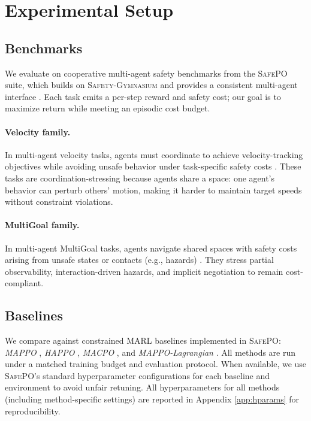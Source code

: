 \documentclass{article}
\theoremstyle{plain}
\theoremstyle{definition}
\theoremstyle{remark}
\begin{document}

\section{Experimental Setup}
\label{sec:experiments}

\subsection{Benchmarks}
We evaluate on cooperative multi-agent safety benchmarks from the \textsc{SafePO} suite, which builds on \textsc{Safety-Gymnasium} and provides a consistent multi-agent interface \citep{ji2024safetygymnasiumunifiedsafereinforcement}.
Each task emits a per-step reward and safety cost; our goal is to maximize return while meeting an episodic cost budget.

\paragraph{Velocity family.}
In multi-agent velocity tasks, agents must coordinate to achieve velocity-tracking objectives while avoiding unsafe behavior under task-specific safety costs \citep{6386109}.
These tasks are coordination-stressing because agents share a space: one agent’s behavior can perturb others’ motion, making it harder to maintain target speeds without constraint violations.

\paragraph{MultiGoal family.}
In multi-agent MultiGoal tasks, agents navigate shared spaces with safety costs arising from unsafe states or contacts (e.g., hazards) \citep{ji2024safetygymnasiumunifiedsafereinforcement}.
They stress partial observability, interaction-driven hazards, and implicit negotiation to remain cost-compliant.

\subsection{Baselines}
We compare against constrained MARL baselines implemented in \textsc{SafePO}: \emph{MAPPO} \cite{yu2022surprisingeffectivenessppocooperative}, \emph{HAPPO} \cite{kuba2022happo}, \emph{MACPO} \cite{gu2023macpo}, and \emph{MAPPO-Lagrangian} \cite{gu2023macpo}.
All methods are run under a matched training budget and evaluation protocol. When available, we use \textsc{SafePO}'s standard hyperparameter configurations for each baseline and environment to avoid unfair retuning. All hyperparameters for all methods (including method-specific settings) are reported in Appendix \ref{app:hparams} for reproducibility.
\end{document}
